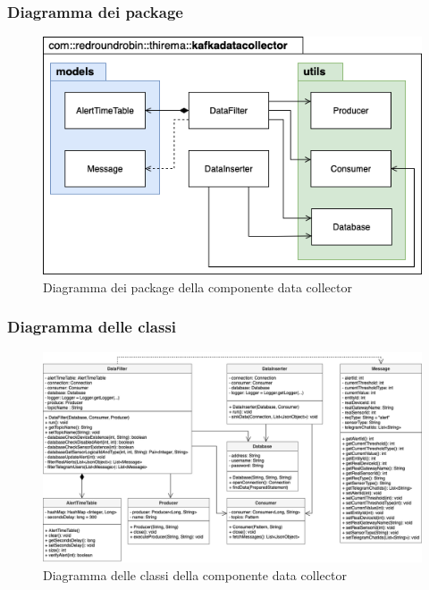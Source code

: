 		\subsubsection{Diagramma dei package}%
		\begin{figure}[H]
				\centering
				\includegraphics[scale=0.600]{res/images/DATACOLLECTOR/Packagekafkadatacollector.png}
				\caption{Diagramma dei package della componente data collector}
				\label{Diagramma 5}
			\end{figure}
		\begin{landscape}
		\subsubsection{Diagramma delle classi}%
			\begin{figure}[H]
				\centering
				\includegraphics[scale=0.550]{res/images/DATACOLLECTOR/ClassikafkaDataCollector.png}
				\caption{Diagramma delle classi della componente data collector}
				\label{Diagramma 6}
			\end{figure}
		\end{landscape}
